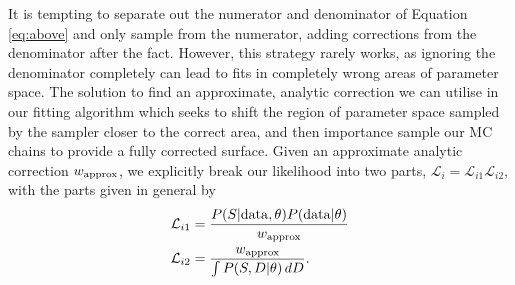 \documentclass[a4paper,fleqn,usenatbib]{mnras}
\begin{document}
It is tempting to separate out the numerator and denominator of Equation \eqref{eq:above} and only sample from the numerator, adding corrections from the denominator after the fact. However, this strategy rarely works, as ignoring the denominator completely can lead to fits in completely wrong areas of parameter space. The solution to find an approximate, analytic correction we can utilise in our fitting algorithm which seeks to shift the region of parameter space sampled by the sampler closer to the correct area, and then importance sample our MC chains to provide a fully corrected surface. Given an approximate analytic correction $w_{\rm approx}$, we explicitly break our likelihood into two parts, $\mathcal{L}_i = \mathcal{L}_{i1} \mathcal{L}_{i2}$, with the parts given in general by
\begin{align}
\mathcal{L}_{i1} &= \frac{P(S|{\rm data},\theta) P({\rm data}|\theta)}{w_{\rm approx}} \\
\mathcal{L}_{i2} &= \frac{w_{\rm approx}}{\int P(S, D|\theta)\, dD}.
\end{align}
\end{document}
